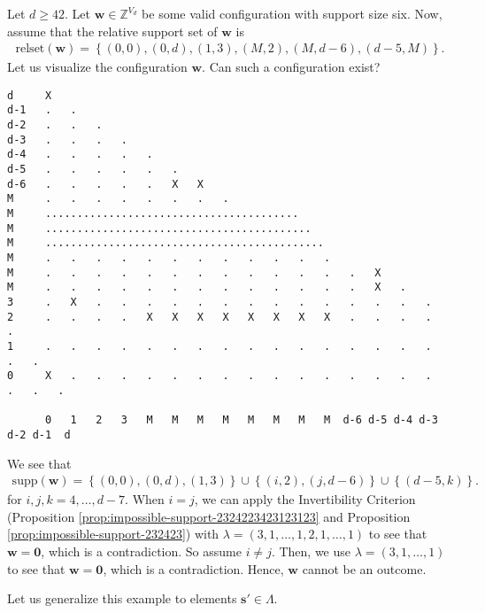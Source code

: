 \begin{example}\label{ex:siuh438h89}
    Let \( d \geq 42 \). Let \( \mathbf{w} \in \mathbb{Z}^{V_d} \) be some valid configuration with support size six. Now, assume that the relative support set of \( \mathbf{w} \) is 
    \begin{align*}
        \mathrm{relset}(\mathbf{w}) = \left\{ (0,0), (0,d), (1,3), (M,2), (M, d-6), (d-5, M) \right\}.
    \end{align*}
    Let us visualize the configuration \( \mathbf{w} \). Can such a configuration exist?
    \begin{verbatim}
d     X
d-1   .   .
d-2   .   .   .
d-3   .   .   .   .
d-4   .   .   .   .   .
d-5   .   .   .   .   .   .
d-6   .   .   .   .   .   X   X
M     .   .   .   .   .   .   .   .
M     ........................................
M     ..........................................
M     ............................................
M     .   .   .   .   .   .   .   .   .   .   .   .   
M     .   .   .   .   .   .   .   .   .   .   .   .   .   X
M     .   .   .   .   .   .   .   .   .   .   .   .   .   X   .   
3     .   X   .   .   .   .   .   .   .   .   .   .   .   .   .   .
2     .   .   .   .   X   X   X   X   X   X   X   X   .   .   .   .   .     
1     .   .   .   .   .   .   .   .   .   .   .   .   .   .   .   .   .   .
0     X   .   .   .   .   .   .   .   .   .   .   .   .   .   .   .   .   .   .

      0   1   2   3   M   M   M   M   M   M   M   M  d-6 d-5 d-4 d-3 d-2 d-1  d
    \end{verbatim}
    We see that 
    \begin{align*}
        \mathrm{supp}(\mathbf{w}) = \left\{ (0,0), (0,d), (1,3) \right\} \cup \left\{ (i,2), (j,d-6 ) \right\} \cup \left\{ (d-5,k ) \right\}.
    \end{align*}
    for \( i,j,k  = 4, \dots, d-7 \). When \( i = j \), we can apply the Invertibility Criterion (Proposition \ref{prop:impossible-support-2324223423123123} and Proposition \ref{prop:impossible-support-232423}) with \( \lambda = (3,1, \dots,1, 2, 1, \dots, 1) \) to see that \( \mathbf{w} = \mathbf{0} \), which is a contradiction. So assume \( i \neq j \). Then, we use \( \lambda = (3, 1, \dots, 1) \) to see that \( \mathbf{w} = \mathbf{0} \), which is a contradiction. Hence, \( \mathbf{w} \) cannot be an outcome.
\end{example}

Let us generalize this example to elements \(  \mathbf{s}' \in \Lambda \).

